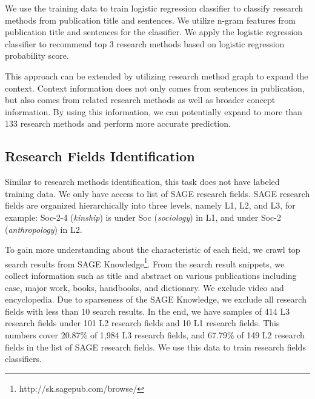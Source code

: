 We use the training data to train logistic regression classifier to classify research methods from publication title and sentences. We utilize n-gram features from publication title and sentences for the classifier. We apply the logistic regression classifier to recommend top 3 research methods based on logistic regression probability score.

This approach can be extended by utilizing research method graph to expand the context. Context information does not only comes from sentences in publication, but also comes from related research methods as well as broader concept information. By using this information, we can potentially expand to more than 133 research methods and perform more accurate prediction.

\subsection{Research Fields Identification}
\label{ssec:research_field_identification}

Similar to research methods identification, this task does not have labeled training data. We only have access to list of SAGE research fields. SAGE research fields are organized hierarchically into three levels, namely L1, L2, and L3, for example: Soc-2-4 (\textit{kinship}) is under Soc (\textit{sociology}) in L1, and under Soc-2 (\textit{anthropology}) in L2.

To gain more understanding about the characteristic of each field, we crawl top search results from SAGE Knowledge\footnote{http://sk.sagepub.com/browse/}. From the search result snippets, we collect information such as title and abstract on various publications including case, major work, books, handbooks, and dictionary. We exclude video and encyclopedia. Due to sparseness of the SAGE Knowledge, we exclude all research fields with less than 10 search results. In the end, we have samples of 414 L3 research fields under 101 L2 research fields and 10 L1 research fields. This numbers cover 20.87\% of 1,984 L3 research fields, and 67.79\% of 149 L2 research fields in the list of SAGE research fields. We use this data to train research fields classifiers.

